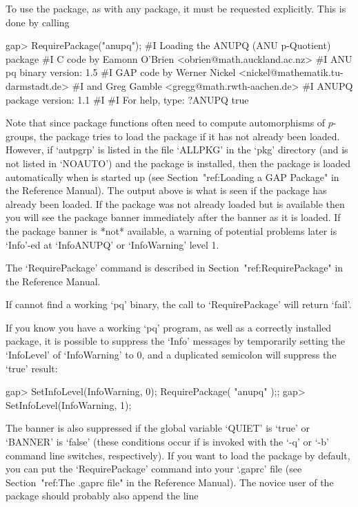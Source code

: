 \endlist


To use the {\ANUPQ} package, as with  any  {\GAP}  package,  it  must  be
requested explicitly. This is done by calling

\beginexample
gap> RequirePackage("anupq");
#I    Loading the ANUPQ (ANU p-Quotient) package
#I    C code by  Eamonn O'Brien <obrien@math.auckland.ac.nz>
#I                ANU pq binary version: 1.5
#I    GAP code by Werner Nickel <nickel@mathematik.tu-darmstadt.de>
#I            and   Greg Gamble  <gregg@math.rwth-aachen.de>
#I                ANUPQ package version: 1.1
#I  
#I                For help, type: ?ANUPQ
true
\endexample

Note  that  since  {\ANUPQ}  package  functions  often  need  to  compute
automorphisms of $p$-groups, the  {\ANUPQ}  package  tries  to  load  the
{\AutPGrp} package if  it  has  not  already  been  loaded.  However,  if
`autpgrp' is listed in the file `ALLPKG' in the `pkg' directory  (and  is
not listed in `NOAUTO') and the {\AutPGrp} package is installed, then the
{\AutPGrp} package is loaded automatically when {\GAP} is started up (see
Section~"ref:Loading a GAP Package" in the Reference Manual). The  output
above is what is seen if the {\AutPGrp} package has already been  loaded.
If the {\AutPGrp} package was not already loaded but  is  available  then
you will see the {\AutPGrp} package banner immediately after the {\ANUPQ}
banner as it is  loaded.  If  the  {\AutPGrp}  package  banner  is  *not*
available,  a  warning  of  potential  problems  later  is  `Info'-ed  at
`InfoANUPQ' or `InfoWarning' level 1.

The `RequirePackage' command is described in Section~"ref:RequirePackage"
in the {\GAP} Reference Manual.

If {\GAP} cannot find a working `pq' binary, the call to `RequirePackage'
will return `fail'.

If you know you have a working `pq'  program,  as  well  as  a  correctly
installed {\ANUPQ}  package,  it  is  possible  to  suppress  the  `Info'
messages by temporarily setting the `InfoLevel' of  `InfoWarning'  to  0,
and a duplicated semicolon will suppress the `true' result:

\beginexample
gap> SetInfoLevel(InfoWarning, 0); RequirePackage( "anupq" );;
gap> SetInfoLevel(InfoWarning, 1);
\endexample

The banner is also suppressed if the global {\GAP}  variable  `QUIET'  is
`true' or `BANNER' is  `false'  (these  conditions  occur  if  {\GAP}  is
invoked with the `-q' or `-b' command line  switches,  respectively).  If
you want to load the  {\ANUPQ}  package  by  default,  you  can  put  the
`RequirePackage' command into your `.gaprc'  file  (see  Section~"ref:The
.gaprc file" in the {\GAP} Reference Manual).  The  novice  user  of  the
{\ANUPQ} package should probably also append the line

